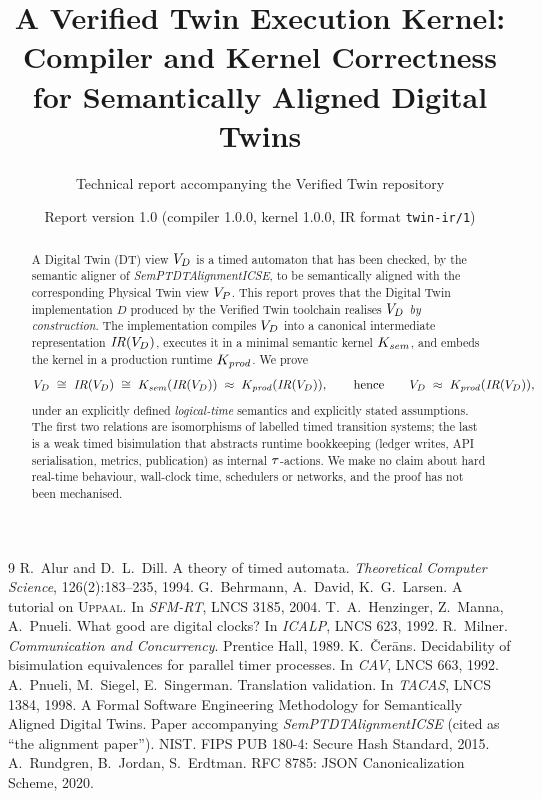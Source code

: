 \documentclass[11pt]{article}
\title{A Verified Twin Execution Kernel:\\
Compiler and Kernel Correctness for Semantically Aligned Digital Twins}
\author{Technical report accompanying the Verified Twin repository}
\date{Report version 1.0 \quad (compiler 1.0.0, kernel 1.0.0, IR format \texttt{twin-ir/1})}
\begin{document}
\maketitle

\begin{abstract}
A Digital Twin (DT) view $V_D$ is a timed automaton that has been checked, by the
semantic aligner of \emph{SemPTDTAlignmentICSE}, to be semantically aligned with
the corresponding Physical Twin view $V_P$. This report proves that the Digital
Twin implementation $D$ produced by the Verified Twin toolchain realises $V_D$
\emph{by construction}. The implementation compiles $V_D$ into a canonical
intermediate representation $\mathit{IR}(V_D)$, executes it in a minimal semantic kernel
$K_{\mathit{sem}}$, and embeds the kernel in a production runtime $K_{\mathit{prod}}$. We prove
\[
  V_D \;\cong\; \mathit{IR}(V_D) \;\cong\; K_{\mathit{sem}}(\mathit{IR}(V_D)) \;\approx\; K_{\mathit{prod}}(\mathit{IR}(V_D)),
  \qquad\text{hence}\qquad V_D \;\approx\; K_{\mathit{prod}}(\mathit{IR}(V_D)),
\]
under an explicitly defined \emph{logical-time} semantics and explicitly stated
assumptions. The first two relations are isomorphisms of labelled timed
transition systems; the last is a weak timed bisimulation that abstracts
runtime bookkeeping (ledger writes, API serialisation, metrics, publication)
as internal $\tau$-actions. We make no claim about hard real-time
behaviour, wall-clock time, schedulers or networks, and the proof has not
been mechanised.
\end{abstract}

\tableofcontents
\newpage











\appendix


\begin{thebibliography}{9}
 R.~Alur and D.~L.~Dill. A theory of timed automata.
  \emph{Theoretical Computer Science}, 126(2):183--235, 1994.
 G.~Behrmann, A.~David, K.~G.~Larsen. A tutorial on \textsc{Uppaal}.
  In \emph{SFM-RT}, LNCS 3185, 2004.
 T.~A.~Henzinger, Z.~Manna, A.~Pnueli. What good are digital clocks?
  In \emph{ICALP}, LNCS 623, 1992.
 R.~Milner. \emph{Communication and Concurrency}. Prentice Hall, 1989.
 K.~\v{C}er\=ans. Decidability of bisimulation equivalences for
  parallel timer processes. In \emph{CAV}, LNCS 663, 1992.
 A.~Pnueli, M.~Siegel, E.~Singerman. Translation validation.
  In \emph{TACAS}, LNCS 1384, 1998.
 A Formal Software Engineering Methodology for Semantically Aligned
  Digital Twins. Paper accompanying \emph{SemPTDTAlignmentICSE} (cited as ``the
  alignment paper'').
 NIST. FIPS PUB 180-4: Secure Hash Standard, 2015.
 A.~Rundgren, B.~Jordan, S.~Erdtman. RFC 8785: JSON Canonicalization Scheme, 2020.
\end{thebibliography}
\end{document}
